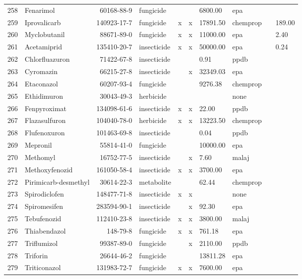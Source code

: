 \begin{longtable}{lp{3cm}rlp{0.5cm}p{0.5cm}p{1cm}p{1cm}p{1cm}p{1cm}}
  258 & Fenarimol & 60168-88-9 & fungicide &  &  & 6800.00 & epa &  &  \\ 
  259 & Iprovalicarb & 140923-17-7 & fungicide & x & x & 17891.50 & chemprop &  & 189.00 \\ 
  260 & Myclobutanil & 88671-89-0 & fungicide & x & x & 11000.00 & epa &  & 2.40 \\ 
  261 & Acetamiprid & 135410-20-7 & insecticide & x & x & 50000.00 & epa &  & 0.24 \\ 
  262 & Chlorfluazuron & 71422-67-8 & insecticide &  &  & 0.91 & ppdb &  &  \\ 
  263 & Cyromazin & 66215-27-8 & insecticide &  & x & 32349.03 & epa &  &  \\ 
  264 & Etaconazol & 60207-93-4 & fungicide &  &  & 9276.38 & chemprop &  &  \\ 
  265 & Ethidimuron & 30043-49-3 & herbicide &  &  &  & none &  &  \\ 
  266 & Fenpyroximat & 134098-61-6 & insecticide & x & x & 22.00 & ppdb &  &  \\ 
  267 & Flazasulfuron & 104040-78-0 & herbicide & x & x & 13223.50 & chemprop &  &  \\ 
  268 & Flufenoxuron & 101463-69-8 & insecticide &  &  & 0.04 & ppdb &  &  \\ 
  269 & Mepronil & 55814-41-0 & fungicide &  &  & 10000.00 & epa &  &  \\ 
  270 & Methomyl & 16752-77-5 & insecticide &  & x & 7.60 & malaj &  &  \\ 
  271 & Methoxyfenozid & 161050-58-4 & insecticide & x & x & 3700.00 & epa &  &  \\ 
  272 & Pirimicarb-desmethyl & 30614-22-3 & metabolite &  &  & 62.44 & chemprop &  &  \\ 
  273 & Spirodiclofen & 148477-71-8 & insecticide & x & x &  & none &  &  \\ 
  274 & Spiromesifen & 283594-90-1 & insecticide &  & x & 92.30 & epa &  &  \\ 
  275 & Tebufenozid & 112410-23-8 & insecticide & x & x & 3800.00 & malaj &  &  \\ 
  276 & Thiabendazol & 148-79-8 & fungicide & x & x & 761.18 & epa &  &  \\ 
  277 & Triflumizol & 99387-89-0 & fungicide &  & x & 2110.00 & ppdb &  &  \\ 
  278 & Triforin & 26644-46-2 & fungicide &  &  & 13811.28 & epa &  &  \\ 
  279 & Triticonazol & 131983-72-7 & fungicide & x & x & 7600.00 & epa &  &  \\ 

\end{longtable}
